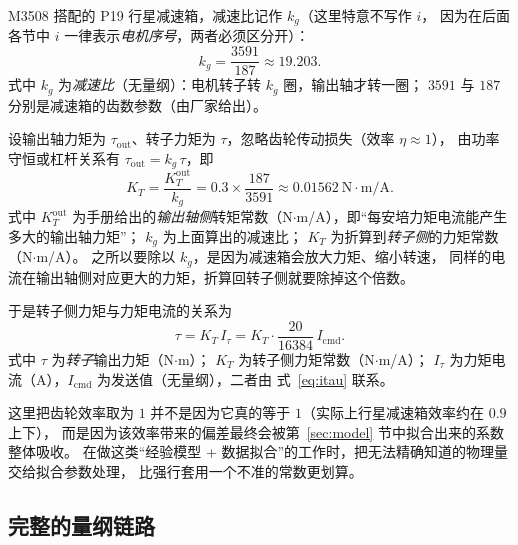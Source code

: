 \documentclass[cn,blue,11pt,device=normal]{elegantnote}
\newcommand{\Icmd}{I_{\mathrm{cmd}}{}}
\newcommand{\Itau}{I_{\tau}{}}
\newcommand{\KT}{K_{T}{}}
\newcommand{\fref}[1]{式~\eqref{#1}}
\begin{document}
M3508 搭配的 P19 行星减速箱，减速比记作 $k_g$（这里特意不写作 $i$，
因为在后面各节中 $i$ 一律表示\emph{电机序号}，两者必须区分开）：
\begin{equation}\label{eq:gearratio}
  k_g = \frac{3591}{187} \approx 19.203 .
\end{equation}
式中 $k_g$ 为\emph{减速比}（无量纲）：电机转子转 $k_g$ 圈，输出轴才转一圈；
$3591$ 与 $187$ 分别是减速箱的齿数参数（由厂家给出）。

设输出轴力矩为 $\tau_{\mathrm{out}}$、转子力矩为 $\tau$，忽略齿轮传动损失（效率 $\eta \approx 1$），
由功率守恒或杠杆关系有 $\tau_{\mathrm{out}} = k_g\,\tau$，即
\begin{equation}\label{eq:kt}
  \KT = \frac{K_T^{\mathrm{out}}}{k_g}
      = 0.3 \times \frac{187}{3591}
      \approx 0.01562\ \mathrm{N\cdot m/A}.
\end{equation}
式中 $K_T^{\mathrm{out}}$ 为手册给出的\emph{输出轴侧}转矩常数（N$\cdot$m/A），即“每安培力矩电流能产生多大的输出轴力矩”；
$k_g$ 为上面算出的减速比；
$\KT$ 为折算到\emph{转子侧}的力矩常数（N$\cdot$m/A）。
之所以要除以 $k_g$，是因为减速箱会放大力矩、缩小转速，
同样的电流在输出轴侧对应更大的力矩，折算回转子侧就要除掉这个倍数。

于是转子侧力矩与力矩电流的关系为
\begin{equation}\label{eq:tau-itau}
  \tau = \KT\,\Itau = \KT \cdot \frac{20}{16384}\,\Icmd .
\end{equation}
式中 $\tau$ 为\emph{转子}输出力矩（N$\cdot$m）；
$\KT$ 为转子侧力矩常数（N$\cdot$m/A）；
$\Itau$ 为力矩电流（A），$\Icmd$ 为发送值（无量纲），二者由 \fref{eq:itau} 联系。

\begin{remark}
这里把齿轮效率取为 $1$ 并不是因为它真的等于 $1$（实际上行星减速箱效率约在 $0.9$ 上下），
而是因为该效率带来的偏差最终会被第~\ref{sec:model} 节中拟合出来的系数整体吸收。
在做这类“经验模型 + 数据拟合”的工作时，把无法精确知道的物理量交给拟合参数处理，
比强行套用一个不准的常数更划算。
\end{remark}

\subsection{完整的量纲链路}
\end{document}
